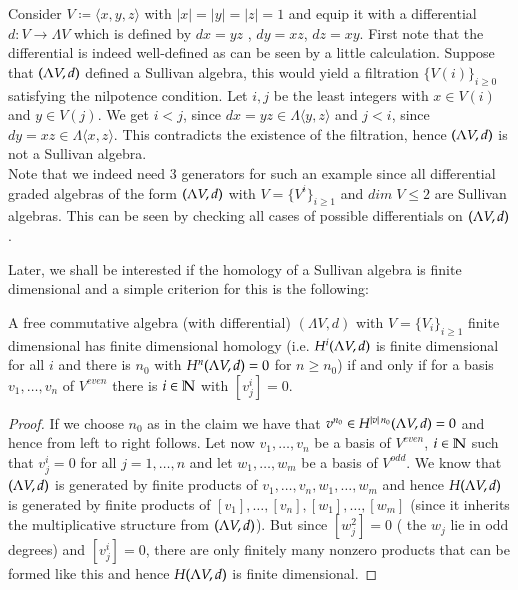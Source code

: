 \begin{Example}
 Consider  $V \coloneqq \langle x,y,z \rangle$ with $|x| = |y| = |z| = 1$ and 
 equip it with a differential $d \colon V \to \Lambda V$ which is defined by $dx = yz$ , $dy = xz$, $dz = xy$. \newline
 First note that the differential is indeed well-defined as can be seen by a little calculation.
 Suppose that $(\Lambda V,d)$ defined a Sullivan algebra, this would yield a filtration ${\lbrace V(i) \rbrace}_{i \geq 0}$ satisfying
 the nilpotence condition. Let $i,j$ be the least integers with $x \in V(i)$ and $y \in V(j)$. We get
 $i < j$, since $dx = yz \in \Lambda \langle y,z \rangle$ and $j < i$, since $dy = xz \in \Lambda \langle x,z \rangle$.
 This contradicts the existence of the filtration, hence $(\Lambda V,d)$ is not a Sullivan algebra. \\
 Note that we indeed need $3$ generators for such an example since all differential graded algebras of the form
 $(\Lambda V,d)$ with $ V = {\lbrace V^i \rbrace}_{i \geq 1}$ and $dim \; V \leq 2$ are Sullivan algebras. This can be 
 seen by checking all cases of possible differentials on $(\Lambda V,d)$.
 \end{Example}
 
 Later, we shall be interested if the homology of a Sullivan algebra is finite dimensional and a simple criterion 
 for this is the following:
 \begin{Lemma}
  A free commutative algebra (with differential) $(\Lambda V,d)$ with $V = {\lbrace V_i \rbrace}_{i \geq 1}$ finite dimensional
  has finite dimensional homology (i.e. $H^i (\Lambda V,d)$ is finite dimensional for all $i$ and there is $n_0$ with
  $H^n (\Lambda V,d) = 0$ for $n \geq n_0$) if and only if for a basis $ v_1, \ldots, v_n$ of $V^{even}$ there is 
  $i \in \mathbb{N}$ with $[v^i_j] = 0$.
 \end{Lemma}
 
 \begin{proof}
  If we choose $n_0$ as in the claim we have that $v^{n_0} \in H^{|v| \, n_0} (\Lambda V,d) = 0$ and hence from
  left to right follows.
  Let now $v_1, \ldots, v_n$ be a basis of $V^{even}$, $i \in \mathbb{N}$ such that $v_j^i = 0$ for all $j = 1, \ldots, n$ and let
  $w_1, \ldots, w_m$ be a basis of $V^{odd}$. We know that $(\Lambda V,d)$ is generated by finite products
  of $v_1, \ldots, v_n, w_1, \ldots, w_m$  and hence  $H (\Lambda V,d) $ is generated by finite 
  products of $[v_1], \ldots, [v_n], [w_1], \ldots, [w_m]$ (since it inherits the multiplicative structure from
  $(\Lambda V,d)$). But since $[w_j^2] = 0$ ( the $w_j$ lie in odd degrees) and $[v_j^i] = 0$, there are only finitely
  many nonzero products that can be formed like this and hence $H (\Lambda V,d)$ is finite dimensional.
 \end{proof}

